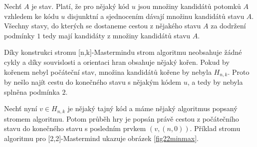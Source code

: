 \begin{pozn}
    
    Nechť $A$ je stav. Platí, že pro nějaký kód $u$ jsou množiny kandidátů potomků $A$ vzhledem ke kódu $u$ disjunktní a sjednocením dávají množinu kandidátů stavu $A$. Všechny stavy, do kterých se dostaneme cestou z nějakého stavu $A$ za dodržení podmínky $1$ tedy mají kandidáty z množiny kandidátů stavu $A$. 

    Díky konstrukci stromu [n,k]-Mastermindu strom algoritmu neobsahuje žádné cykly a díky souvislosti a orientaci hran obsahuje nějaký kořen. Pokud by kořenem nebyl počáteční stav, množina kandidátů kořene by nebyla $H_{n,k}$. Proto by nešlo najít cestu do konečného stavu s nějakým kódem $u$, a tedy by nebyla splněna podmínka $2$. 

    Nechť nyní $v\in H_{n,k}$ je nějaký tajný kód a máme nějaký algoritmus popsaný stromem algoritmu. Potom průběh hry je popsán právě cestou z počátečního stavu do konečného stavu s posledním prvkem $(v,(n,0))$. Příklad stromu algoritmu pro [2,2]-Mastermind ukazuje obrázek \ref{fig22minmax}. 
    

    
\end{pozn}






